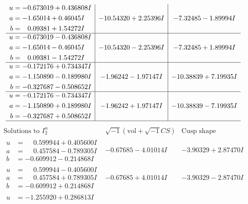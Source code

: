\documentclass[1p]{elsarticle_modified}
\theoremstyle{definition}
\newcommand{\I}{\sqrt{-1}}
\begin{document}
$$\begin{array}{c|c|c}
\begin{aligned}
u &= -0.673019 + 0.436808 I \\
a &= -1.65014 + 0.46045 I \\
b &= \phantom{-}0.09381 + 1.54272 I\end{aligned}
 & -10.54320 + 2.25396 I & -7.32485 - 1.89994 I \\ \hline\begin{aligned}
u &= -0.673019 - 0.436808 I \\
a &= -1.65014 - 0.46045 I \\
b &= \phantom{-}0.09381 - 1.54272 I\end{aligned}
 & -10.54320 - 2.25396 I & -7.32485 + 1.89994 I \\ \hline\begin{aligned}
u &= -0.172176 + 0.734347 I \\
a &= -1.150890 - 0.189980 I \\
b &= -0.327687 - 0.508652 I\end{aligned}
 & -1.96242 - 1.97147 I & -10.38839 + 7.19935 I \\ \hline\begin{aligned}
u &= -0.172176 - 0.734347 I \\
a &= -1.150890 + 0.189980 I \\
b &= -0.327687 + 0.508652 I\end{aligned}
 & -1.96242 + 1.97147 I & -10.38839 - 7.19935 I\\
 \hline 
 \end{array}$$\newpage$$\begin{array}{c|c|c}  
\text{Solutions to }I^u_{2}& \I (\text{vol} + \sqrt{-1}CS) & \text{Cusp shape}\\
 \hline 
\begin{aligned}
u &= \phantom{-}0.599944 + 0.405600 I \\
a &= \phantom{-}0.457584 - 0.789305 I \\
b &= -0.609912 - 0.214868 I\end{aligned}
 & -0.67685 - 4.01014 I & -3.90329 + 2.87470 I \\ \hline\begin{aligned}
u &= \phantom{-}0.599944 - 0.405600 I \\
a &= \phantom{-}0.457584 + 0.789305 I \\
b &= -0.609912 + 0.214868 I\end{aligned}
 & -0.67685 + 4.01014 I & -3.90329 - 2.87470 I \\ \hline\begin{aligned}
u &= -1.255920 + 0.286813 I \\

\end{aligned}
\end{array}$$
\end{document}
